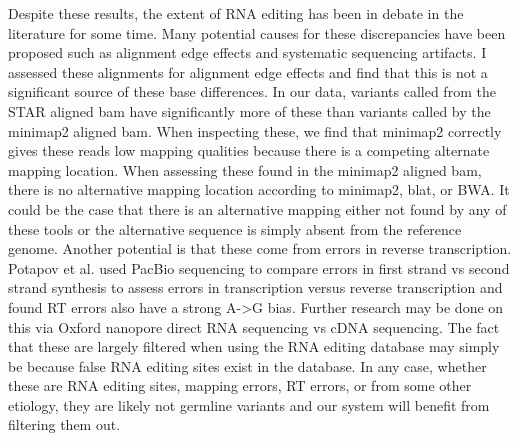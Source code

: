 \par{
Despite these results, the extent of RNA editing has been in debate in the literature for some time\cite{li2011widespread}\cite{check2012rna}. Many potential causes for these discrepancies have been proposed such as alignment edge effects and systematic sequencing artifacts. I assessed these alignments for alignment edge effects and find that this is not a significant source of these base differences. In our data, variants called from the STAR aligned bam have significantly more of these than variants called by the minimap2 aligned bam. When inspecting these, we find that minimap2 correctly gives these reads low mapping qualities because there is a competing alternate mapping location. When assessing these found in the minimap2 aligned bam, there is no alternative mapping location according to minimap2, blat, or BWA. It could be the case that there is an alternative mapping either not found by any of these tools or the alternative sequence is simply absent from the reference genome. Another potential is that these come from errors in reverse transcription. Potapov et al. used PacBio sequencing to compare errors in first strand vs second strand synthesis to assess errors in transcription versus reverse transcription and found RT errors also have a strong A->G bias\cite{RTerrors}. Further research may be done on this via Oxford nanopore direct RNA sequencing vs cDNA sequencing. The fact that these are largely filtered when using the RNA editing database may simply be because false RNA editing sites exist in the database. In any case, whether these are RNA editing sites, mapping errors, RT errors, or from some other etiology, they are likely not germline variants and our system will benefit from filtering them out.
}

